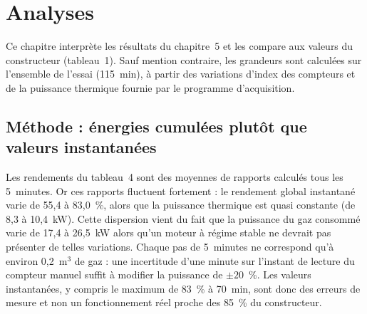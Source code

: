 \section{Analyses}
\label{sec:analyses}


%

Ce chapitre interprète les résultats du chapitre~5 et les compare aux
valeurs du constructeur (tableau~1). Sauf mention contraire, les
grandeurs sont calculées sur l'ensemble de l'essai (115~min), à partir
des variations d'index des compteurs et de la puissance thermique
fournie par le programme d'acquisition.

\subsection{Méthode : énergies cumulées plutôt que valeurs instantanées}
\label{sec:methode}

Les rendements du tableau~4 sont des moyennes de rapports calculés tous
les 5~minutes. Or ces rapports fluctuent fortement : le rendement global
instantané varie de 55,4 à 83,0~\%, alors que la puissance thermique
est quasi constante (de 8,3 à 10,4~kW). Cette dispersion vient du
fait que la puissance du gaz consommé varie de
17,4 à 26,5~kW alors qu'un moteur à régime stable ne devrait pas présenter de
telles variations. Chaque pas de 5~minutes ne correspond qu'à environ
0,2~m$^3$ de gaz : une incertitude d'une minute sur l'instant de lecture
du compteur manuel suffit à modifier la puissance de $\pm 20$~\%. Les
valeurs instantanées, y compris le maximum de 83~\% à 70~min, sont donc
des erreurs de mesure et non un fonctionnement réel proche des 85~\%
du constructeur.

